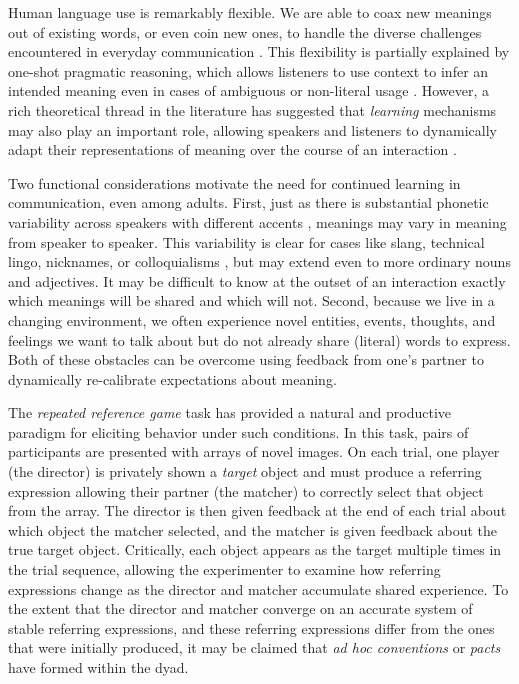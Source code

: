 \documentclass[alpha-refs]{wiley-article}
\begin{document}
Human language use is remarkably flexible. 
We are able to coax new meanings out of existing words, or even coin new ones, to handle the diverse challenges encountered in everyday communication \citep{Clark83_NonceSense,davidson_nice_1986}.
This flexibility is partially explained by one-shot pragmatic reasoning, which allows listeners to use context to infer an intended meaning even in cases of ambiguous or non-literal usage \citep{LascaridesCopestake98_PragmaticsWordMeaning,Glucksberg01_FigurativeLanguage,piantadosi2012communicative,GoodmanFrank16_RSATiCS}.
However, a rich theoretical thread in the literature has suggested that \emph{learning} mechanisms may also play an important role, allowing speakers and listeners to dynamically adapt their representations of meaning over the course of an interaction \citep{BrennanClark96_ConceptualPactsConversation,pickering2004toward,delaney2019neural}.

Two functional considerations motivate the need for continued learning in communication, even among adults.
First, just as there is substantial phonetic variability across speakers with different accents \citep{kleinschmidt2019structure}, meanings may vary in meaning from speaker to speaker. 
This variability is clear for cases like slang, technical lingo, nicknames, or colloquialisms \citep[e.g.][]{Clark98_CommunalLexicons}, but may extend even to more ordinary nouns and adjectives. 
It may be difficult to know at the outset of an interaction exactly which meanings will be shared and which will not.
Second, because we live in a changing environment, we often experience novel entities, events, thoughts, and feelings we want to talk about but do not already share (literal) words to express.
Both of these obstacles can be overcome using feedback from one's partner to dynamically re-calibrate expectations about meaning.

The \emph{repeated reference game} task has provided a natural and productive paradigm for eliciting behavior under such conditions.
In this task, pairs of participants are presented with arrays of novel images. 
On each trial, one player (the director) is privately shown a \emph{target} object and must produce a referring expression allowing their partner (the matcher) to correctly select that object from the array.
The director is then given feedback at the end of each trial about which object the matcher selected, and the matcher is given feedback about the true target object. 
Critically, each object appears as the target multiple times in the trial sequence, allowing the experimenter to examine how referring expressions change as the director and matcher accumulate shared experience.
To the extent that the director and matcher converge on an accurate system of stable referring expressions, and these referring expressions differ from the ones that were initially produced, it may be claimed that \emph{ad hoc conventions} or \emph{pacts} have formed within the dyad.
\end{document}
